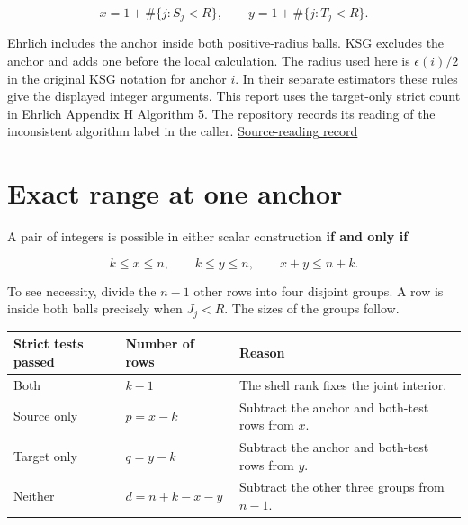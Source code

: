 \[
x=1+\#\{j:S_j<R\},\qquad y=1+\#\{j:T_j<R\}.
\]

Ehrlich includes the anchor inside both positive-radius balls. KSG excludes the anchor and adds one before the local calculation. The radius used here is \(\epsilon(i)/2\) in the original KSG notation for anchor \(i\). In their separate estimators these rules give the displayed integer arguments. This report uses the target-only strict count in Ehrlich Appendix H Algorithm 5. The repository records its reading of the inconsistent algorithm label in the caller. \href{https://github.com/sepahead/pid-rs/blob/main/audit/source-errata.json}{Source-reading record}

\section{Exact range at one anchor}\label{exact-range-at-one-anchor}

A pair of integers is possible in either scalar construction \textbf{if and only if}

\[
k\le x\le n,\qquad k\le y\le n,\qquad x+y\le n+k.
\]

To see necessity, divide the \(n-1\) other rows into four disjoint groups. A row is inside both balls precisely when \(J_j<R\). The sizes of the groups follow.

{\def\LTcaptype{none} %
\begin{longtable}[]{@{}
  >{\raggedright\arraybackslash}p{}
  >{\raggedleft\arraybackslash}p{}
  >{\raggedright\arraybackslash}p{}@{}}
\toprule\noalign{}
\begin{minipage}[b]{\linewidth}\raggedright
Strict tests passed
\end{minipage} & \begin{minipage}[b]{\linewidth}\raggedleft
Number of rows
\end{minipage} & \begin{minipage}[b]{\linewidth}\raggedright
Reason
\end{minipage} \\
\midrule\noalign{}
\endhead
\bottomrule\noalign{}
\endlastfoot
Both & \(k-1\) & The shell rank fixes the joint interior. \\
Source only & \(p=x-k\) & Subtract the anchor and both-test rows from \(x\). \\
Target only & \(q=y-k\) & Subtract the anchor and both-test rows from \(y\). \\
Neither & \(d=n+k-x-y\) & Subtract the other three groups from \(n-1\). \\
\end{longtable}
}

